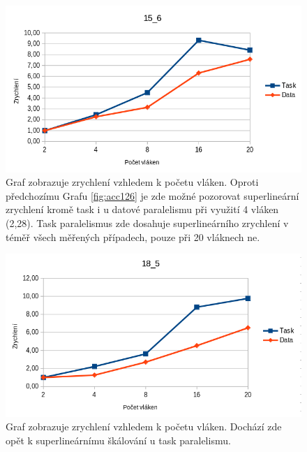 \documentclass{article}%
\begin{document}
\begin{figure}[H]%
    \centering%
    \includegraphics[width=1\linewidth]{images/acc_15_6.png}%

    \caption{Graf zobrazuje zrychlení vzhledem k početu vláken. Oproti předchozímu Grafu \ref{fig:acc126} je zde možné pozorovat superlineární zrychlení kromě task i u datové paralelismu při využití 4 vláken (2,28). Task paralelismus zde dosahuje superlineárního zrychlení v téměř všech měřených případech, pouze při 20 vláknech ne.}%
    \label{fig:acc156}
\end{figure}

\begin{figure}[H]%
    \centering%
    \includegraphics[width=1\linewidth]{images/acc_18_5.png}%
    \caption{Graf zobrazuje zrychlení vzhledem k početu vláken. Dochází zde opět k superlineárnímu škálování u task paralelismu.  }%
    \label{fig:acc185}
\end{figure}
\end{document}
